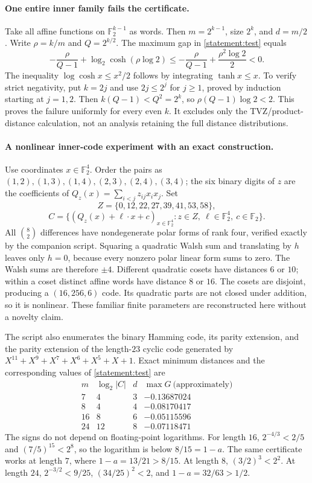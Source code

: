 \documentclass[11pt,a4paper]{article}
\newcommand{\F}{\mathbb{F}}
\numberwithin{equation}{section}
\begin{document}
\paragraph{One entire inner family fails the certificate.}
Take all affine functions on $\F_2^{k-1}$ as words. Then $m=2^{k-1}$,
size $2^k$, and $d=m/2$. Write $\rho=k/m$ and $Q=2^{k/2}$. The maximum
gap in \eqref{statement:test} equals
\[
 -\frac{\rho}{Q-1}+\log_2\cosh(\rho\log2)
 \le-\frac{\rho}{Q-1}+\frac{\rho^2\log2}{2}<0.
\]
The inequality $\log\cosh x\le x^2/2$ follows by integrating
$\tanh x\le x$. To verify strict negativity, put $k=2j$ and use
$2j\le2^j$ for $j\ge1$, proved by induction starting at $j=1,2$.
Then $k(Q-1)<Q^2=2^k$, so $\rho(Q-1)\log2<2$. This proves the failure
uniformly for every even $k$. It excludes only the TVZ/product-distance
calculation, not an analysis retaining the full distance distributions.

\paragraph{A nonlinear inner-code experiment with an exact construction.}
Use coordinates $x\in\F_2^4$. Order the pairs as
$(1,2),(1,3),(1,4),(2,3),(2,4),(3,4)$; the six binary digits of $z$ are the
coefficients of $Q_z(x)=\sum_{i<j}z_{ij}x_ix_j$. Set
\[
 Z=\{0,12,22,27,39,41,53,58\},
\]
\[
 C=\{(Q_z(x)+\ell\cdot x+c)_{x\in\F_2^4}:
       z\in Z,\ \ell\in\F_2^4,\ c\in\F_2\}.
\]
All $\binom82$ differences have nondegenerate polar forms of rank four,
verified exactly by the companion script. Squaring a quadratic Walsh sum
and translating by $h$ leaves only $h=0$, because every nonzero polar linear
form sums to zero. The Walsh sums are therefore $\pm4$. Different quadratic
cosets have distances $6$ or $10$; within a coset distinct affine words have
distance $8$ or $16$. The cosets are disjoint, producing a $(16,256,6)$ code.
Its quadratic parts are not closed under addition, so it is nonlinear.
These familiar finite parameters are reconstructed here without a novelty
claim.

The script also enumerates the binary Hamming code, its parity extension,
and the parity extension of the length-$23$ cyclic code generated by
$X^{11}+X^9+X^7+X^6+X^5+X+1$. Exact minimum distances and the corresponding
values of \eqref{statement:test} are
\[
\begin{array}{c|c|c|r}
 m&\log_2|C|&d&\max G\ \text{(approximately)}\\\hline
 7&4&3&-0.13687024\\
 8&4&4&-0.08170417\\
 16&8&6&-0.05115596\\
 24&12&8&-0.07118471
\end{array}
\]
The signs do not depend on floating-point logarithms. For length $16$,
$2^{-4/3}<2/5$ and $(7/5)^{15}<2^8$, so the logarithm is below
$8/15=1-a$. The same certificate works at length $7$, where
$1-a=13/21>8/15$. At length $8$, $(3/2)^3<2^2$. At length $24$,
$2^{-3/2}<9/25$, $(34/25)^2<2$, and $1-a=32/63>1/2$.
\end{document}
